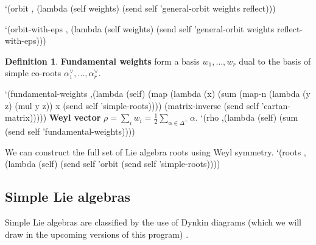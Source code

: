 \documentclass[a4paper,10pt]{article}
\theoremstyle{definition} \newtheorem{Def}{Definition}
\begin{document}
`(orbit ,
  (lambda (self weights)
    (send self 'general-orbit weights reflect)))

`(orbit-with-eps ,
  (lambda (self weights)
    (send self 'general-orbit weights reflect-with-eps)))
\nwendcode{}\nwdocspar
\begin{Def}
  {\bf Fundamental weights} form a basis $w_1,\dots,w_r$ dual to the basis of simple co-roots $\alpha_1^{\vee},\dots,\alpha_r^{\vee}$.
\end{Def}
\nwenddocs{}\plusendmoddef
`(fundamental-weights
  ,(lambda (self)
     (map (lambda (x)
            (sum (map-n (lambda (y z) (mul y z)) x (send self 'simple-roots))))
          (matrix-inverse (send self 'cartan-matrix)))))
\nwendcode{}\nwdocspar
{\bf Weyl vector} $\rho=\sum_i w_i=\frac{1}{2}\sum_{\alpha\in \Delta^{+}}\alpha$.
\nwenddocs{}\plusendmoddef
`(rho ,(lambda (self)
         (sum (send self 'fundamental-weights))))

\nwendcode{}\nwdocspar
We can construct the full set of Lie algebra roots using Weyl symmetry.
\nwenddocs{}\plusendmoddef
`(roots ,(lambda (self)
           (send self 'orbit (send self 'simple-roots))))
\nwendcode{}\nwdocspar

\subsection{Simple Lie algebras}
\label{sec:simple-lie-algebras}

Simple Lie algebras are classified by the use of Dynkin diagrams (which we will draw in the upcoming versions of this program) \cite{carter2005lie}.
\end{document}
